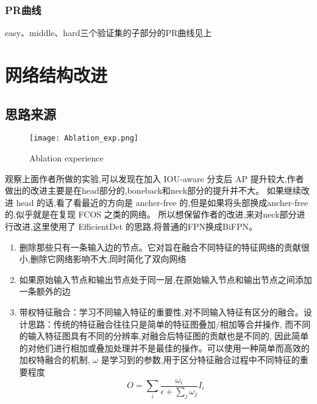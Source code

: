 \documentclass[10pt,a4paper]{article}%
\begin{document}
	\subsubsection{PR曲线}
	easy、middle、hard三个验证集的子部分的PR曲线见上

	\section{网络结构改进}
	\subsection{思路来源}
	\begin{figure}[h]%
		\centering
		\begin{minipage}{1\textwidth}%
			\centering
			\texttt{[image: Ablation\_exp.png]}%
			\caption{\fontsize{10pt}{15pt}\selectfont Ablation experience
		}%
		\end{minipage}
	\end{figure}		
	观察上面作者所做的实验,可以发现在加入 IOU-aware 分支后 AP 提升较大,作者做出的改进主要是在head部分的,boneback和neck部分的提升并不大。
	如果继续改进 head 的话,看了看最近的方向是 ancher-free 的,但是如果将头部换成ancher-free的,似乎就是在复现 FCOS\cite{DBLP:conf/iccv/TianSCH19} 之类的网络。
	所以想保留作者的改进,来对neck部分进行改进,这里使用了 EfficientDet\cite{DBLP:journals/corr/abs-1911-09070} 的思路,将普通的FPN换成BiFPN。\\
	\begin{enumerate}[1.]
		\item 删除那些只有一条输入边的节点。它对旨在融合不同特征的特征网络的贡献很小,删除它网络影响不大,同时简化了双向网络\\
		\item 如果原始输入节点和输出节点处于同一层,在原始输入节点和输出节点之间添加一条额外的边\\
		\item 带权特征融合：学习不同输入特征的重要性,对不同输入特征有区分的融合。设计思路：传统的特征融合往往只是简单的特征图叠加/相加等合并操作,
		而不同的输入特征图具有不同的分辨率,对融合后特征图的贡献也是不同的,
		因此简单的对他们进行相加或叠加处理并不是最佳的操作。可以使用一种简单而高效的加权特融合的机制, $\omega$ 是学习到的参数,用于区分特征融合过程中不同特征的重要程度
		\begin{equation}
			O = \sum_{i} \frac{\omega_i}{\epsilon + \sum_{j} \omega_j} I_i
		\end{equation}
	\end{enumerate}
	
\end{document}
